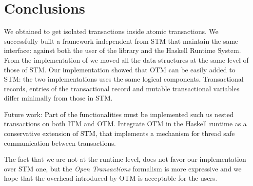 
\chapter{Conclusions}

We obtained to get isolated transactions inside atomic transactions.
We successfully built a framework independent from STM that maintain the same interface: against both the user of the library and the Haskell Runtime System.
From the implementation of \citet{Toneguzzo} we moved all the data structures at the same level of those of STM.
Our implementation showed that OTM can be easily added to STM: the two implementations uses the same logical components. Transactional records, entries of the transactional record and mutable transactional variables differ minimally from those in STM.

Future work:
Part of the functionalities must be implemented such us nested transactions on both ITM and OTM.
Integrate OTM in the Haskell runtime as a conservative extension of STM, that implements a mechanism for thread safe communication between transactions.

The fact that we are not at the runtime level, does not favor our implementation over STM one, but the \emph{Open Transactions} formalism is more expressive and we hope that the overhead introduced by OTM is acceptable for the users.
